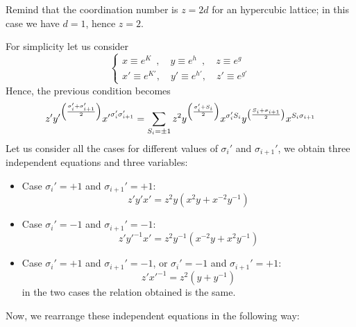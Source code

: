 \documentclass[../main/main.tex]{subfiles}
\begin{document}
\begin{remark}
Remind that the coordination number is \( z=2d \) for an hypercubic lattice; in this case we have \( d=1 \), hence \( z=2 \).
\end{remark}
For simplicity let us consider
\begin{equation}
  \begin{cases}
   x \equiv e^K \,\,\,, \quad y \equiv e^h\,\,\,, \quad  z \equiv e^g \\
   x' \equiv e^{K'}, \quad  y' \equiv e^{h'}, \quad  z' \equiv e^{g'}
  \end{cases}
\end{equation}
Hence, the previous condition becomes
\begin{equation*}
  z' {y'}^{\qty(\frac{\sigma _i'+\sigma _{i+1}'}{2}) } {x'}^{\sigma _i'\sigma _{i+1}'}
  = \sum_{S_i = \pm 1}^{} z^2 y^{\qty(\frac{\sigma _i' +S_i}{2}) } x^{\sigma _i' S_i} y^{ \qty(\frac{S_i + \sigma _{i+1}}{2})} x^{S_i \sigma _{i+1}}
\end{equation*}
Let us consider all the cases for different values of \( \sigma _i' \) and \( \sigma _{i+1}' \), we obtain three independent equations and three variables:
\begin{itemize}
\item Case \( \sigma _i'=+1 \) and \( \sigma _{i+1}'=+1 \):
\begin{equation}
  z'y'x' = z^2 y (x^2y+x^{-2}y^{-1})
  \label{eq:20_7}
\end{equation}

\item Case \( \sigma _i'=-1 \) and \( \sigma _{i+1}'=-1 \):
\begin{equation}
  z'{y'}^{-1}x' = z^2 y^{-1} (x^{-2} y+x^{2}y^{-1})
  \label{eq:20_8}
\end{equation}

\item Case \( \sigma _i'=+1 \) and \( \sigma _{i+1}'=-1 \), or \( \sigma _i'=-1 \) and \( \sigma _{i+1}'=+1 \):
\begin{equation}
  z'{x'}^{-1} = z^2 (y+y^{-1})
  \label{eq:20_9}
\end{equation}
in the two cases the relation obtained is the same.
\end{itemize}
Now, we rearrange these independent equations in the following way:
\end{document}
